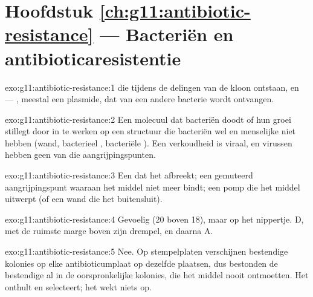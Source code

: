 \section*{Hoofdstuk \ref{ch:g11:antibiotic-resistance} --- Bacteriën en antibioticaresistentie}

\begin{solution}{exo:g11:antibiotic-resistance:1}
 die tijdens de delingen van de kloon ontstaan, en  --- , meestal een plasmide, dat van een andere bacterie
wordt ontvangen.
\end{solution}

\begin{solution}{exo:g11:antibiotic-resistance:2}
Een molecuul dat bacteriën doodt of hun groei stillegt door in te werken
op een structuur die bacteriën wel en menselijke  niet hebben
(wand, bacterieel , bacteriële ). Een
verkoudheid is viraal, en virussen hebben geen van die
aangrijpingspunten.
\end{solution}

\begin{solution}{exo:g11:antibiotic-resistance:3}
Een  dat het  afbreekt; een gemuteerd aangrijpingspunt
waaraan het middel niet meer bindt; een pomp die het middel uitwerpt (of
een wand die het buitensluit).
\end{solution}

\begin{solution}{exo:g11:antibiotic-resistance:4}
Gevoelig (20 boven 18), maar op het nippertje. D, met de ruimste marge
boven zijn drempel, en daarna A.
\end{solution}

\begin{solution}{exo:g11:antibiotic-resistance:5}
Nee. Op stempelplaten verschijnen bestendige kolonies op elke
antibioticumplaat op dezelfde plaatsen, dus bestonden de bestendige
 al in de oorspronkelijke kolonies, die het middel nooit ontmoetten.
Het  onthult en selecteert; het wekt niets op.
\end{solution}

